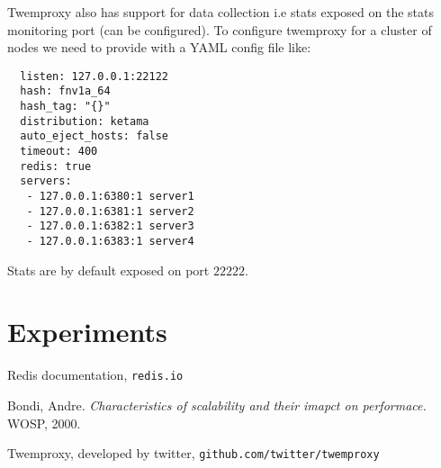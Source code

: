 \documentclass[11pt]{article}
\begin{document}
Twemproxy also has support for data collection i.e stats exposed on the
stats monitoring port (can be configured).
To configure twemproxy for a cluster of nodes we need to provide with a YAML config
file like:
\begin{file}[conf]
\begin{lstlisting}
  listen: 127.0.0.1:22122
  hash: fnv1a_64
  hash_tag: "{}"
  distribution: ketama
  auto_eject_hosts: false
  timeout: 400
  redis: true
  servers:
   - 127.0.0.1:6380:1 server1
   - 127.0.0.1:6381:1 server2
   - 127.0.0.1:6382:1 server3
   - 127.0.0.1:6383:1 server4
\end{lstlisting}
\end{file}
Stats are by default exposed on port $22222$.


\pagebreak
\section*{Experiments}



\pagebreak
\begin{thebibliography}{9}

Redis documentation,
\texttt{redis.io}
        
Bondi, Andre.
\textit{Characteristics of scalability and their imapct on performace.}
WOSP, 2000.

Twemproxy, developed by twitter,
\texttt{github.com/twitter/twemproxy}

\end{thebibliography}
\end{document}
